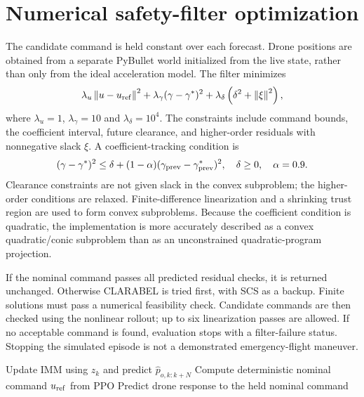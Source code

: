 \section{Numerical safety-filter optimization}
The candidate command is held constant over each forecast. Drone positions are obtained from a separate PyBullet world initialized from the live state, rather than only from the ideal acceleration model. The filter minimizes
\begin{equation}
\lambda_u\left\lVert u-u_{\rm ref}\right\rVert^2+
\lambda_\gamma(\gamma-\gamma^*)^2+
\lambda_\delta\left(\delta^2+\left\lVert\xi\right\rVert^2\right),
\label{eq:filtercost}
\end{equation}
where $\lambda_u=1$, $\lambda_\gamma=10$ and $\lambda_\delta=10^4$. The constraints include command bounds, the coefficient interval, future clearance, and higher-order residuals with nonnegative slack $\xi$. A coefficient-tracking condition is
\begin{equation}
(\gamma-\gamma^*)^2\leq\delta+
(1-\alpha)(\gamma_{\rm prev}-\gamma^*_{\rm prev})^2,
\quad \delta\geq0,\quad \alpha=0.9.
\end{equation}
Clearance constraints are not given slack in the convex subproblem; the higher-order conditions are relaxed. Finite-difference linearization and a shrinking trust region are used to form convex subproblems. Because the coefficient condition is quadratic, the implementation is more accurately described as a convex quadratic/conic subproblem than as an unconstrained quadratic-program projection.

If the nominal command passes all predicted residual checks, it is returned unchanged. Otherwise CLARABEL is tried first, with SCS as a backup. Finite solutions must pass a numerical feasibility check. Candidate commands are then checked using the nonlinear rollout; up to six linearization passes are allowed. If no acceptable command is found, evaluation stops with a filter-failure status. Stopping the simulated episode is not a demonstrated emergency-flight maneuver.

\begin{algorithm}[htbp]
\caption{Hierarchical control at one evaluation sample}\label{alg:control}
Update IMM using $z_k$ and predict $\hat p_{o,k:k+N}$\;
Compute deterministic nominal command $u_{\rm ref}$ from PPO\;
Predict drone response to the held nominal command\;
\end{algorithm}

